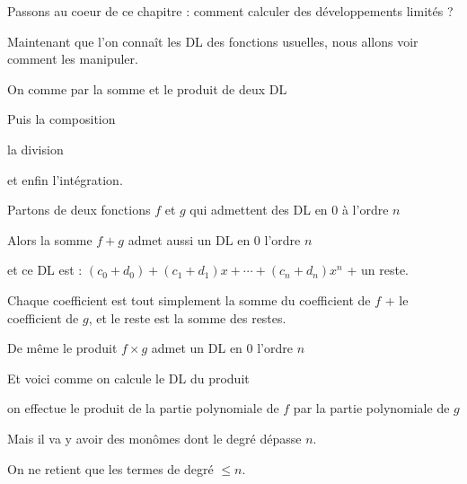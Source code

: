 







\debuttexte

\diapo

Passons au coeur de ce chapitre : comment calculer des développements limités ?

\change

Maintenant que l'on connaît les DL des fonctions usuelles, nous allons voir
comment les manipuler.


\change

On comme par la somme et le produit de deux DL

\change

Puis la composition
 
\change 

la division

\change

et enfin l'intégration.

\diapo

Partons de deux fonctions  $f$ et $g$ qui admettent des DL en $0$ à l'ordre $n$ 


\change

 Alors la somme $f+g$ admet aussi un DL en $0$ l'ordre $n$ 

\change

et ce DL est :
$(c_0+d_0)+(c_1+d_1)x+\cdots+(c_n+d_n)x^n$ + un reste.

Chaque coefficient est tout simplement la somme du coefficient de $f$ +
le coefficient de $g$, et le reste est la somme des restes.

\change

De même le produit $f\times g$ admet un DL en $0$ l'ordre $n$

\change

Et voici comme on calcule le  DL du produit


 
on effectue le produit de la partie polynomiale de $f$
par la partie polynomiale  de $g$

Mais il va y avoir des monômes dont le degré  dépasse $n$.


On ne retient que les termes de degré $\le n$.



